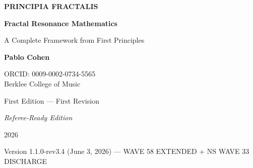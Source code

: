 \begin{titlepage}
\centering
\vspace*{2cm}

{\Huge\bfseries PRINCIPIA FRACTALIS}

\vspace{0.8cm}

{\huge\bfseries Fractal Resonance Mathematics}

\vspace{1cm}

{\LARGE A Complete Framework from First Principles}

\vspace{2cm}

{\Large\textbf{Pablo Cohen}}

\vspace{0.5cm}

{\large
ORCID: 0009-0002-0734-5565\\
Berklee College of Music
}

\vspace{2cm}


\vfill

{\large First Edition --- First Revision}

\vspace{0.3cm}

{\normalsize \textit{Referee-Ready Edition}}

\vspace{0.5cm}

{\large 2026}

\vspace{1cm}

{\normalsize Version 1.1.0-rev3.4 (June 3, 2026) --- WAVE 58 EXTENDED + NS WAVE 33 DISCHARGE}

\end{titlepage}
